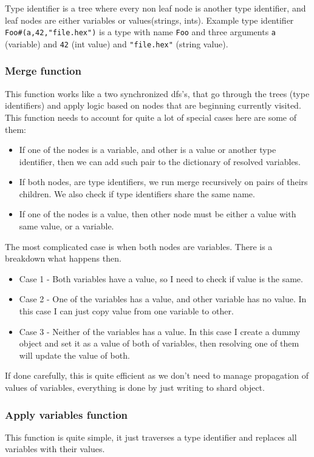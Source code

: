 \documentclass[14pt]{report}
\begin{document}
Type identifier is a tree where every non leaf node is another type identifier, and leaf nodes are either variables or values(strings, ints). Example type identifier \verb!Foo#(a,42,"file.hex")! is a type with name \verb!Foo! and three arguments \verb!a! (variable) and \verb!42! (int value) and \verb!"file.hex"! (string value).

\subsubsection*{Merge function}
This function works like a two synchronized dfs's, that go through the trees (type identifiers) and apply logic based on nodes that are beginning currently visited.
This function needs to account for quite a lot of special cases here are some of them:
\begin{itemize}
    \item If one of the nodes is a variable, and other is a value or another type identifier, then we can add such pair to the dictionary of resolved variables.
    \item If both nodes, are type identifiers, we run merge recursively on pairs of theirs children. We also check if type identifiers share the same name.
    \item If one of the nodes is a value, then other node must be either a value with same value, or a variable.
\end{itemize}
The most complicated case is when both nodes are variables. There is a breakdown what happens then. 
\begin{itemize}
    \item Case 1 - Both variables have a value, so I need to check if value is the same.
    \item Case 2 - One of the variables has a value, and other variable has no value. In this case I can just copy value from one variable to other.
    \item Case 3 - Neither of the variables has a value. In this case I create a dummy object and set it as a value of both of variables, then resolving one of them will update the value of both.
\end{itemize}
If done carefully, this is quite efficient as we don't need to manage propagation of values of variables, everything is done by just writing to shard object.

\subsubsection{Apply variables function}
This function is quite simple, it just traverses a type identifier and replaces all variables with their values.
\end{document}
